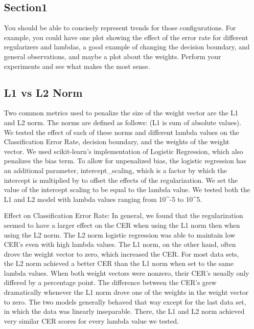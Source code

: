 \documentclass[10pt,twoside]{article}
\begin{document}
\subsection{Section1}


You should be able to concisely represent trends for those configurations. For example, you could have one plot showing the effect of the error rate for different regularizers and lambdas, a good example of changing the decision boundary, and general observations, and maybe a plot about the weights. Perform your experiments and see what makes the most sense.

\subsection{L1 vs L2 Norm}

Two common metrics used to penalize the size of the weight vector are the L1 and L2 norm. The norms are defined as follows: (L1 is sum of absolute values). We tested the effect of each of these norms and different lambda values on the Classification Error Rate, decision boundary, and the weights of the weight vector. We used scikit-learn's implementation of Logistic Regression, which also penalizes the bias term. To allow for unpenalized bias, the logistic regression has an additional parameter, intercept_scaling, which is a factor by which the intercept is multiplied by to offset the effects of the regularization. We set the value of the intercept scaling to be equal to the lambda value. We tested both the L1 and L2 model with lambda values ranging from 10^-5 to 10^5. 

Effect on Classification Error Rate:
In general, we found that the regularization seemed to have a larger effect on the CER when using the L1 norm then when using the L2 norm. The L2 norm logistic regression was able to maintain low CER's even with high lambda values. The L1 norm, on the other hand, often drove the weight vector to zero, which increased the CER. For most data sets, the L2 norm achieved a better CER than the L1 norm when set to the same lambda values. When both weight vectors were nonzero, their CER's usually only differed by a percentage point. The difference between the CER's grew dramatically whenever the L1 norm drove one of the weights in the weight vector to zero. The two models generally behaved that way except for the last data set, in which the data was linearly inseparable. There, the L1 and L2 norm achieved very similar CER scores for every lambda value we tested. 
\end{document}
